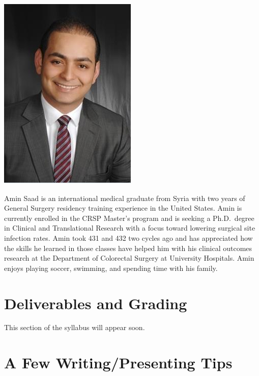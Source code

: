 \documentclass[
]{book}
\begin{document}
\includegraphics[width=0.3\linewidth]{figures/Amin}

Amin Saad is an international medical graduate from Syria with two years of General Surgery residency training experience in the United States. Amin is currently enrolled in the CRSP Master's program and is seeking a Ph.D.~degree in Clinical and Translational Research with a focus toward lowering surgical site infection rates. Amin took 431 and 432 two cycles ago and has appreciated how the skills he learned in those classes have helped him with his clinical outcomes research at the Department of Colorectal Surgery at University Hospitals. Amin enjoys playing soccer, swimming, and spending time with his family.

\hypertarget{deliverables-and-grading}{%
\chapter{Deliverables and Grading}\label{deliverables-and-grading}}

This section of the syllabus will appear soon.

\hypertarget{a-few-writingpresenting-tips}{%
\chapter{A Few Writing/Presenting Tips}\label{a-few-writingpresenting-tips}}
\end{document}
